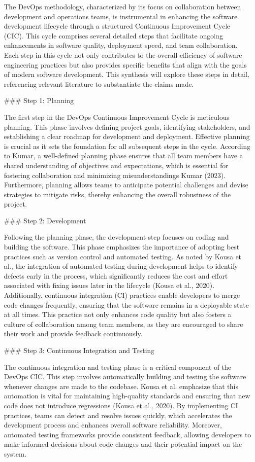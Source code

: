 The DevOps methodology, characterized by its focus on collaboration between development and operations teams, is instrumental in enhancing the software development lifecycle through a structured Continuous Improvement Cycle (CIC). This cycle comprises several detailed steps that facilitate ongoing enhancements in software quality, deployment speed, and team collaboration. Each step in this cycle not only contributes to the overall efficiency of software engineering practices but also provides specific benefits that align with the goals of modern software development. This synthesis will explore these steps in detail, referencing relevant literature to substantiate the claims made.

### Step 1: Planning

The first step in the DevOps Continuous Improvement Cycle is meticulous planning. This phase involves defining project goals, identifying stakeholders, and establishing a clear roadmap for development and deployment. Effective planning is crucial as it sets the foundation for all subsequent steps in the cycle. According to Kumar, a well-defined planning phase ensures that all team members have a shared understanding of objectives and expectations, which is essential for fostering collaboration and minimizing misunderstandings Kumar (2023). Furthermore, planning allows teams to anticipate potential challenges and devise strategies to mitigate risks, thereby enhancing the overall robustness of the project.

### Step 2: Development

Following the planning phase, the development step focuses on coding and building the software. This phase emphasizes the importance of adopting best practices such as version control and automated testing. As noted by Kousa et al., the integration of automated testing during development helps to identify defects early in the process, which significantly reduces the cost and effort associated with fixing issues later in the lifecycle (Kousa et al., 2020). Additionally, continuous integration (CI) practices enable developers to merge code changes frequently, ensuring that the software remains in a deployable state at all times. This practice not only enhances code quality but also fosters a culture of collaboration among team members, as they are encouraged to share their work and provide feedback continuously.

### Step 3: Continuous Integration and Testing

The continuous integration and testing phase is a critical component of the DevOps CIC. This step involves automatically building and testing the software whenever changes are made to the codebase. Kousa et al. emphasize that this automation is vital for maintaining high-quality standards and ensuring that new code does not introduce regressions (Kousa et al., 2020). By implementing CI practices, teams can detect and resolve issues quickly, which accelerates the development process and enhances overall software reliability. Moreover, automated testing frameworks provide consistent feedback, allowing developers to make informed decisions about code changes and their potential impact on the system.


